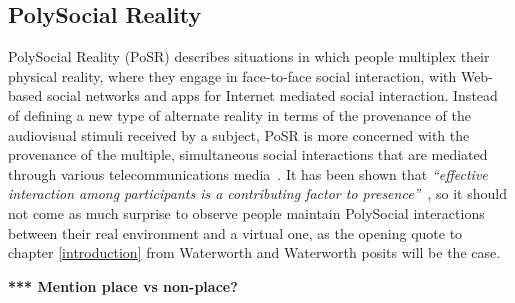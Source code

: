 
\subsection{PolySocial Reality}

PolySocial Reality (PoSR) describes situations in which people multiplex their physical reality, where they engage in face-to-face social interaction, with Web-based social networks and apps for Internet mediated social interaction. Instead of defining a new type of alternate reality in terms of the provenance of the audiovisual stimuli received by a subject, PoSR is more concerned with the provenance of the multiple, simultaneous social interactions that are mediated through various telecommunications media~\cite{Applin2012}. It has been shown that \textit{``effective interaction among participants is a contributing factor to presence''}~\cite{Terashima2001}, so it should not come as much surprise to observe people maintain PolySocial interactions between their real environment and a virtual one, as the opening quote to chapter \ref{introduction} from Waterworth and Waterworth posits will be the case.

\textbf{*** Mention place vs non-place?}







